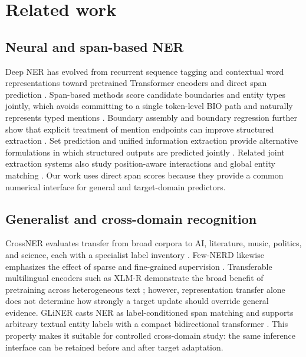 \documentclass[a4paper,fleqn,numbers,doubleblind]{cas-dc}
\begin{document}
\section{Related work}
\subsection{Neural and span-based NER}
Deep NER has evolved from recurrent sequence tagging and contextual word representations \citep{lample2016ner,peters2018elmo,akbik2019flair} toward pretrained Transformer encoders \citep{devlin2019bert,he2021deberta} and direct span prediction \citep{li2022ner}. Span-based methods score candidate boundaries and entity types jointly, which avoids committing to a single token-level BIO path and naturally represents typed mentions \citep{han2023spanbased}. Boundary assembly and boundary regression further show that explicit treatment of mention endpoints can improve structured extraction \citep{tang2022boundaryassembling,tang2023boundaryregression}. Set prediction and unified information extraction provide alternative formulations in which structured outputs are predicted jointly \citep{sui2024setprediction,lu2022uie}. Related joint extraction systems also study position-aware interactions and global entity matching \citep{chen2022positionaware,gao2023ergm,tang2022unirel}. Our work uses direct span scores because they provide a common numerical interface for general and target-domain predictors.

\subsection{Generalist and cross-domain recognition}
CrossNER evaluates transfer from broad corpora to AI, literature, music, politics, and science, each with a specialist label inventory \citep{liu2021crossner}. Few-NERD likewise emphasizes the effect of sparse and fine-grained supervision \citep{ding2021fewnerd}. Transferable multilingual encoders such as XLM-R demonstrate the broad benefit of pretraining across heterogeneous text \citep{conneau2020xlmr}; however, representation transfer alone does not determine how strongly a target update should override general evidence. GLiNER casts NER as label-conditioned span matching and supports arbitrary textual entity labels with a compact bidirectional transformer \citep{zaratiana2024gliner}. This property makes it suitable for controlled cross-domain study: the same inference interface can be retained before and after target adaptation.
\end{document}
